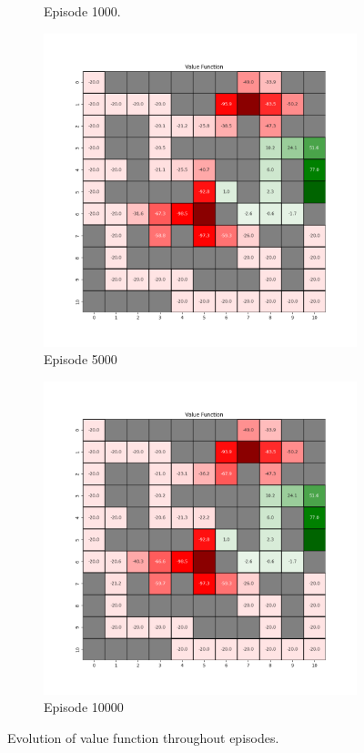 \documentclass{assignment}
\begin{document}
\begin{figure}[H]
\begin{subfigure}{0.3\textwidth}
    \caption{Episode 1000.}
    \end{subfigure}\hfill
    \begin{subfigure}{0.3\textwidth}
        \includegraphics[width=\textwidth]{figures/value_td/alpha_sweep/value_function_alpha_0.5_gamma_0.95_epsilon_0.2_iteration_5000.png}
    \caption{Episode 5000}
    \end{subfigure}\hfill
    \begin{subfigure}{0.3\textwidth}
        \includegraphics[width=\textwidth]{figures/value_td/alpha_sweep/value_function_alpha_0.5_gamma_0.95_epsilon_0.2_iteration_10000.png}
    \caption{Episode 10000}
    \end{subfigure}
    \caption{Evolution of value function throughout episodes.}
    \label{fig:alpha_0.5_td_learning_value}
\end{figure}
\end{document}
